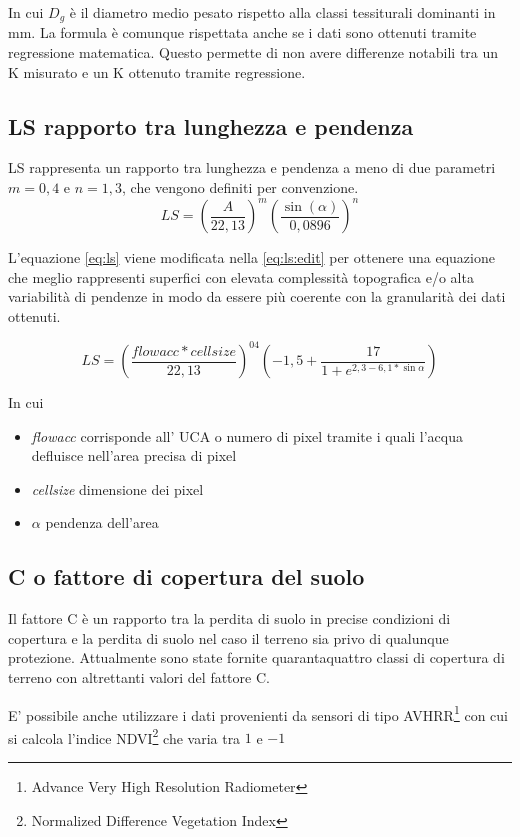 In cui $D_g$ è il diametro medio pesato rispetto alla classi tessiturali dominanti in mm.
La formula è comunque rispettata anche se i dati sono ottenuti tramite regressione matematica. Questo permette di non avere differenze notabili tra un K misurato e un K ottenuto tramite regressione.

\subsection{LS rapporto tra lunghezza e pendenza}
LS rappresenta un rapporto tra lunghezza e pendenza a meno di due parametri $m=0,4$ e $n=1,3$, che vengono definiti per convenzione.
\begin{equation}\label{eq:ls}
	LS = \left(  \dfrac{A}{22,13} \right)^m
	\left(  \dfrac{\sin(\alpha)}{0,0896} \right)^n
\end{equation}

L'equazione \eqref{eq:ls} viene modificata nella \eqref{eq:ls:edit} per ottenere una equazione che meglio rappresenti superfici con elevata complessità topografica e/o alta variabilità di pendenze in modo da essere più coerente con la granularità dei dati ottenuti.

\begin{equation}\label{eq:ls:edit}
LS=\left( \dfrac{flowacc * cellsize}{22,13}\right)^{04} \left( -1,5+\dfrac{17}{1+ e^{2,3-6,1*\sin{\alpha}}} \right)
\end{equation}

In cui
\begin{itemize}
	\item \textit{flowacc} corrisponde all' UCA  o numero di pixel tramite i quali l'acqua defluisce nell'area precisa di pixel
	\item \textit{cellsize} dimensione dei pixel
	\item \textit{$\alpha$} pendenza dell'area
\end{itemize}

\subsection{C o fattore di copertura del suolo}
Il fattore C è un rapporto tra la perdita di suolo in precise condizioni di copertura e la perdita di suolo nel caso il terreno sia privo di qualunque protezione.
Attualmente sono state fornite quarantaquattro classi di copertura di terreno con altrettanti valori del fattore C.

E' possibile anche utilizzare i dati provenienti da sensori di tipo AVHRR\footnote{Advance Very High Resolution Radiometer} con cui si calcola l'indice  NDVI\footnote{Normalized Difference Vegetation Index} che varia tra $1$ e $-1$

